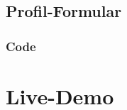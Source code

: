 \subsection{Profil-Formular}
\begin{frame}
 \frametitle{Code}
 \begin{example}
  \makeset
 \end{example}

\end{frame}

\section{Live-Demo}